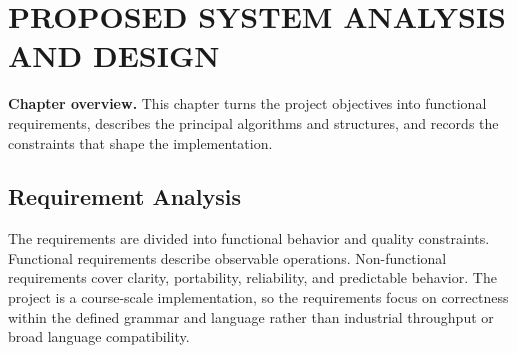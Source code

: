 \documentclass[12pt,a4paper,oneside]{report}
\newcommand{\chapterintro}[1]{\noindent\textbf{Chapter overview.} #1\par\vspace{8pt}}
\begin{document}
\chapter{PROPOSED SYSTEM ANALYSIS AND DESIGN}
\chapterintro{This chapter turns the project objectives into functional requirements, describes the principal algorithms and structures, and records the constraints that shape the implementation.}

\section{Requirement Analysis}
The requirements are divided into functional behavior and quality constraints. Functional requirements describe observable operations. Non-functional requirements cover clarity, portability, reliability, and predictable behavior. The project is a course-scale implementation, so the requirements focus on correctness within the defined grammar and language rather than industrial throughput or broad language compatibility.
\end{document}
